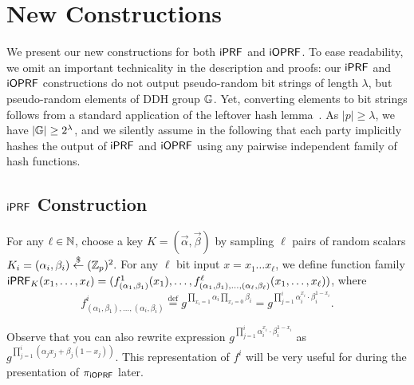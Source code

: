 \section{New Constructions}
We present our new constructions for both $\mathsf{i}\mathsf{PRF}$ and $\mathsf{i}\mathsf{OPRF}$.  To
ease readability, we omit an important technicality in the description
and proofs: our $\mathsf{i}\mathsf{PRF}$ and $\mathsf{i}\mathsf{OPRF}$ constructions do not output
pseudo-random bit strings of length $\lambda$, but pseudo-random
elements of DDH group $\mathbb{G}$. Yet, converting elements to bit strings
follows from a standard application of the leftover hash
lemma~\cite{leftover}. As $|p|\geq\lambda$, we have
$|\mathbb{G}|\ge{}2^\lambda$, and we silently assume in the following that
each party implicitly hashes the output of $\mathsf{i}\mathsf{PRF}$ and $\mathsf{i}\mathsf{OPRF}$ using
any pairwise independent family of hash functions.


\subsection{$\mathsf{i}\mathsf{PRF}$ Construction}
\label{sec:newprf}
\begin{construction}
  \label{const:newprf}
For any $\ell\in{\mathbb{N}}$, choose a key $K=(\vec{{\alpha}},\vec{\beta})$ by
sampling $\ell$ pairs of random scalars
$K_i=({\alpha_{i}},{\beta_{i}})\stackrel{\$}{\leftarrow}{}(\mathbb{Z}_p)^2.$ For any $\ell$ bit
input $x=x_1\ldots{}x_\ell$, we define function family
$\mathsf{i}\mathsf{PRF}_K(x_1,\ldots,x_\ell)=(f^1_{(\alpha_1,\beta_1)}(x_1),\ldots,f^\ell_{(\alpha_1,\beta_1),\ldots,(\alpha_\ell,\beta_\ell)}(x_1,\ldots,x_\ell))$,
where
$$  f^i_{(\alpha_1,\beta_1),\ldots,(\alpha_i,\beta_i)} \stackrel{\text{def}}{=}
  g^{\prod_{x_i=1}\alpha_i \prod_{x_i=0}\beta_i}
=g^{\prod_{j=1}^{i}{\alpha_i^{x_i}\cdot{}\beta_i^{1-x_i}}}.$$


Observe that you can also rewrite expression
$g^{\prod_{j=1}^{i}{\alpha_i^{x_i}\cdot{}\beta_i^{1-x_i}}}$ as
$g^{\prod_{j=1}^{i}(\alpha_j{}x_j+\beta_j(1-x_j))}$. This
representation of $f^i$ will be very useful for during the
presentation of ${\pi_{\mathsf{i}\mathsf{OPRF}}}$ later.

 \end{construction}

